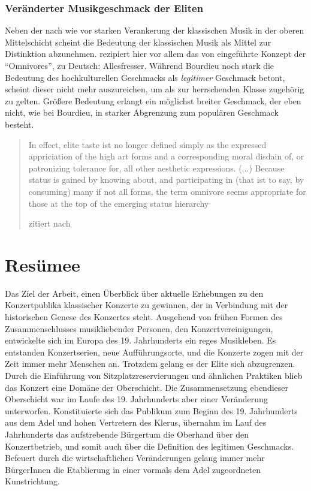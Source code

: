 \documentclass[a4paper, german, oneside]{scrbook}
\begin{document}
\subsection{Veränderter Musikgeschmack der Eliten}
Neben der nach wie vor starken Verankerung der klassischen Musik in der oberen Mittelschicht scheint die Bedeutung der klassischen Musik als Mittel zur Distinktion abzunehmen. \textcite{gebesmair_grundzuge_2001} rezipiert hier vor allem das von \textcite{peterson_understanding_1992} eingeführte Konzept der \enquote{Omnivores}, zu Deutsch: Allesfresser. Während Bourdieu noch stark die Bedeutung des hochkulturellen Geschmacks als \emph{legitimer} Geschmack betont, scheint dieser nicht mehr auszureichen, um als zur herrschenden Klasse zugehörig zu gelten. Größere Bedeutung erlangt ein möglichst breiter Geschmack, der eben nicht, wie bei Bourdieu, in starker Abgrenzung zum populären Geschmack besteht. 

\blockquote[{\cite[252]{peterson_understanding_1992} zitiert nach \cite[206]{gebesmair_grundzuge_2001}}]{In effect, elite taste ist no longer defined simply as the expressed appriciation of the high art forms and a corresponding moral disdain of, or patronizing tolerance for, all other aesthetic expressions. (...) Because status is gained by knowing about, and participating in (that ist to say, by consuming) many if not all forms, the term omnivore seems appropriate for those at the top of the emerging status hierarchy}





\chapter{Resümee}
Das Ziel der Arbeit, einen Überblick über aktuelle Erhebungen zu den Konzertpublika klassischer Konzerte zu gewinnen, der in Verbindung mit der historischen Genese des Konzertes steht. Ausgehend von frühen Formen des Zusammenschlusses musikliebender Personen, den Konzertvereinigungen, entwickelte sich im Europa des 19. Jahrhunderts ein reges Musikleben. Es entstanden Konzertserien, neue Aufführungsorte, und die Konzerte zogen mit der Zeit immer mehr Menschen an. Trotzdem gelang es der Elite sich abzugrenzen. Durch die Einführung von Sitzplatzreservierungen und ähnlichen Praktiken blieb das Konzert eine Domäne der Oberschicht. Die Zusammensetzung ebendieser Oberschicht war im Laufe des 19. Jahrhunderts aber einer Veränderung unterworfen. Konstituierte sich das Publikum zum Beginn des 19. Jahrhunderts aus dem Adel und hohen Vertretern des Klerus, übernahm im Lauf des Jahrhunderts das aufstrebende Bürgertum die Oberhand über den Konzertbetrieb, und somit auch über die Definition des legitimen Geschmacks. Befeuert durch die wirtschaftlichen Veränderungen gelang immer mehr BürgerInnen die Etablierung in einer vormals dem Adel zugeordneten Kunstrichtung.
\end{document}
